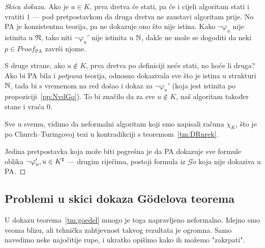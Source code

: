\begin{proof}[Skica dokaza]
Ako je $u\in K$, prva dretva će stati, pa će i cijeli algoritam stati i vratiti $1$ --- pod pretpostavkom da druga dretva ne zaustavi algoritam prije. No PA je konzistentna teorija, pa ne dokazuje ono što nije istina. Kako $\neg\varphi_u$ nije istinita u $\mathfrak N$, tako niti $\neg\varphi_u'$ nije istinita u ${\mathbb N}$, dakle ne može se dogoditi da neki $p\in Proof_{\text{PA}}$ završi njome.

	S druge strane, ako $u\notin K$, prva dretva po definiciji neće stati, no hoće li druga? Ako bi PA bila i \emph{potpuna} teorija, odnosno dokazivala sve što je istina u strukturi ${\mathbb N}$, tada bi s vremenom na red došao i dokaz za $\neg\varphi_u'$ (koja jest istinita po propoziciji~\ref{pp:NvdGo}). To bi značilo da za sve $u\notin K$, naš algoritam također stane i vraća $0$.

Sve u svemu, vidimo da neformalni algoritam koji smo napisali računa $\chi_{K}$, što je po Church--\!Turingovoj tezi u kontradikciji s teoremom~\ref{tm:DRnrek}.

Jedina pretpostavka koja može biti pogrešna je da PA dokazuje sve formule oblika $\neg\varphi_u', u\in K\sp{{\scriptscriptstyle\complement}}$ --- drugim riječima, postoji formula iz $\mathscr G\ddot o$ koja nije dokaziva u PA\@.
\end{proof}

\subsection{Problemi u skici dokaza Gödelova teorema}

U dokazu teorema~\ref{tm:goedel} mnogo je toga napravljeno neformalno. Idejno smo veoma blizu, ali tehnička zahtjevnost takvog rezultata je ogromna. Samo navedimo neke najočitije rupe, i ukratko opišimo kako ih možemo "zakrpati".


